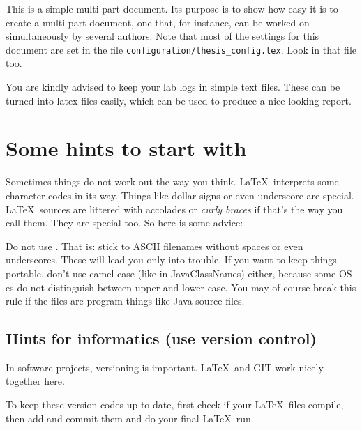 This is a simple multi-part document. Its purpose is to show how easy it is
to create a multi-part document, one that, for instance, can be worked on 
simultaneously by several authors. Note that most of the settings for
this document are set in the file \texttt{configuration/thesis\_config.tex}. 
Look in that file too.

You are kindly advised to keep your lab logs in simple text
files. These can be turned into latex files easily,
which can be used to produce a nice-looking report.
\section{Some hints to start with}
Sometimes things do not work out the way you think.
\LaTeX\ interprets some character codes in its way.
Things like dollar signs or even underscore are special.
\LaTeX\ sources are littered with accolades or \textit{curly braces} if that's
the way you call them. They are special too. So here is some advice: 

Do not use . That is: stick to ASCII filenames without spaces or even underscores. 
These will lead you only into trouble. If you want to keep things portable, 
don't use camel case (like in JavaClassNames) either, because
some OS-es do not distinguish between upper and lower case. You may of
course break this rule if the files are program things like
Java source files.

\subsection{Hints for informatics (use version control)}
In software projects, versioning is important. \LaTeX\ and \textsc{GIT}
work nicely together here.

To keep these version codes up to date, first check if your \LaTeX\  files compile,
then add and commit them and do your final \LaTeX\  run. 

